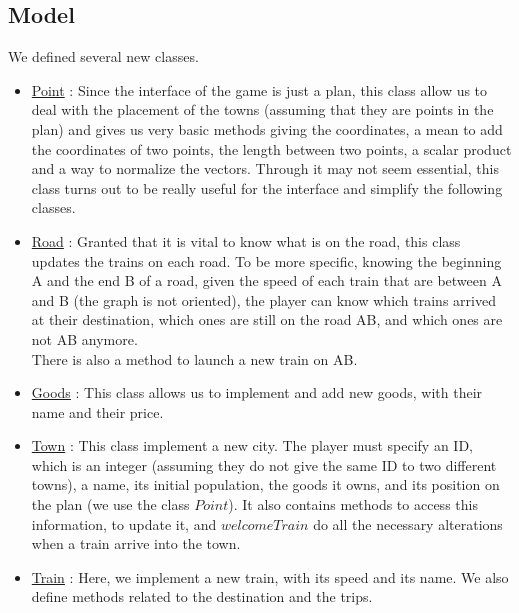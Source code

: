 \documentclass[a4paper]{article}
\begin{document}
	\subsection{Model}
	We defined several new classes.
	\begin{itemize}
		\item \underline{Point} : Since the interface of the game is just a plan, this class allow us to deal with the placement of the towns (assuming that they are points in the plan) and gives us very basic methods giving the coordinates, a mean to add the coordinates of two points, the length between two points, a scalar product and a way to normalize the vectors. Through it may not seem essential, this class turns out to be really useful for the interface and simplify the following classes.

		\item \underline{Road} : Granted that it is vital to know what is on the road, this class updates the trains on each road. To be more specific, knowing the beginning A and the end B of a road, given the speed of each train that are between A and B (the graph is not oriented), the player can know which trains arrived at their destination, which ones are still on the road AB, and which ones are not AB anymore.\\
		There is also a method to launch a new train on AB.

		\item \underline{Goods} : This class allows us to implement and add new goods, with their name and their price.

		\item \underline{Town} : This class implement a new city. The player must specify an ID, which is an integer (assuming they do not give the same ID to two different towns), a name, its initial population, the goods it owns, and its position on the plan (we use the class $Point$). It also contains methods to access this information, to update it, and $welcomeTrain$ do all the necessary alterations when a train arrive into the town.

		\item \underline{Train} : Here, we implement a new train, with its speed and its name. We also define methods related to the destination and the trips.


\end{itemize}
\end{document}
